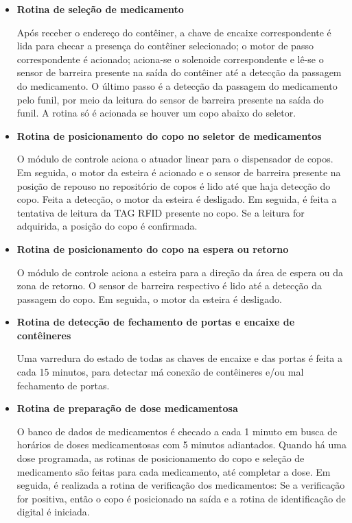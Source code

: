 \begin{itemize}
    \item \textbf{Rotina de seleção de medicamento}
    
    Após receber o endereço do contêiner, a chave de encaixe correspondente é lida para checar a presença do contêiner selecionado; o motor de passo correspondente é acionado; aciona-se o solenoide correspondente e lê-se o sensor de barreira presente na saída do contêiner até a detecção da passagem do medicamento. O último passo é a detecção da passagem do medicamento pelo funil, por meio da leitura do sensor de barreira presente na saída do funil. A rotina só é acionada se houver um copo abaixo do seletor.
    
    \item \textbf{Rotina de posicionamento do copo no seletor de medicamentos}
    
    O módulo de controle aciona o atuador linear para o dispensador de copos. Em seguida, o motor da esteira é acionado e o sensor de barreira presente na posição de repouso no repositório de copos é lido até que haja detecção do copo. Feita a detecção, o motor da esteira é desligado. Em seguida, é feita a tentativa de leitura da TAG RFID presente no copo. Se a leitura for adquirida, a posição do copo é confirmada.
    
    \item \textbf{Rotina de posicionamento do copo na espera ou retorno}
    
    O módulo de controle aciona a esteira para a direção da área de espera ou da zona de retorno. O sensor de barreira respectivo é lido até a detecção da passagem do copo. Em seguida, o motor da esteira é desligado.
    
    \item \textbf{Rotina de detecção de fechamento de portas e encaixe de contêineres}
    
    Uma varredura do estado de todas as chaves de encaixe e das portas é feita a cada 15 minutos, para detectar má conexão de contêineres e/ou mal fechamento de portas.
    
    \item \textbf{Rotina de preparação de dose medicamentosa}
    
    O banco de dados de medicamentos é checado a cada 1 minuto em busca de horários de doses medicamentosas com 5 minutos adiantados. Quando há uma dose programada, as rotinas de posicionamento do copo e seleção de medicamento são feitas para cada medicamento, até completar a dose. Em seguida, é realizada a rotina de verificação dos medicamentos: Se a verificação for positiva, então o copo é posicionado na saída e a rotina de identificação de digital é iniciada.
    

\end{itemize}
